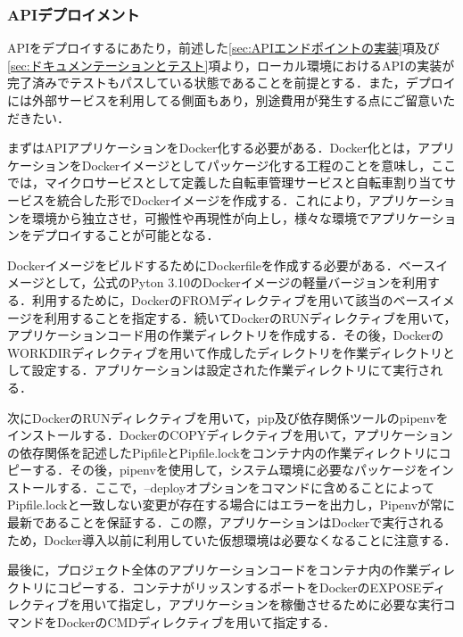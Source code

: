       \subsubsection{APIデプロイメント}
        \label{sec:APIデプロイメント}
          \par APIをデプロイするにあたり，前述した\ref{sec:APIエンドポイントの実装}項及び\ref{sec:ドキュメンテーションとテスト}項より，ローカル環境におけるAPIの実装が完了済みでテストもパスしている状態であることを前提とする．また，デプロイには外部サービスを利用してる側面もあり，別途費用が発生する点にご留意いただきたい．
          \par まずはAPIアプリケーションをDocker化する必要がある．Docker化とは，アプリケーションをDockerイメージとしてパッケージ化する工程のことを意味し，ここでは，マイクロサービスとして定義した自転車管理サービスと自転車割り当てサービスを統合した形でDockerイメージを作成する．これにより，アプリケーションを環境から独立させ，可搬性や再現性が向上し，様々な環境でアプリケーションをデプロイすることが可能となる．
          \par DockerイメージをビルドするためにDockerfileを作成する必要がある．ベースイメージとして，公式のPyton 3.10のDockerイメージの軽量バージョンを利用する．利用するために，DockerのFROMディレクティブを用いて該当のベースイメージを利用することを指定する．続いてDockerのRUNディレクティブを用いて，アプリケーションコード用の作業ディレクトリを作成する．その後，DockerのWORKDIRディレクティブを用いて作成したディレクトリを作業ディレクトリとして設定する．アプリケーションは設定された作業ディレクトリにて実行される．
          \par 次にDockerのRUNディレクティブを用いて，pip及び依存関係ツールのpipenvをインストールする．DockerのCOPYディレクティブを用いて，アプリケーションの依存関係を記述したPipfileとPipfile.lockをコンテナ内の作業ディレクトリにコピーする．その後，pipenvを使用して，システム環境に必要なパッケージをインストールする．ここで，--deployオプションをコマンドに含めることによってPipfile.lockと一致しない変更が存在する場合にはエラーを出力し，Pipenvが常に最新であることを保証する．この際，アプリケーションはDockerで実行されるため，Docker導入以前に利用していた仮想環境は必要なくなることに注意する．
          \par 最後に，プロジェクト全体のアプリケーションコードをコンテナ内の作業ディレクトリにコピーする．コンテナがリッスンするポートをDockerのEXPOSEディレクティブを用いて指定し，アプリケーションを稼働させるために必要な実行コマンドをDockerのCMDディレクティブを用いて指定する．
